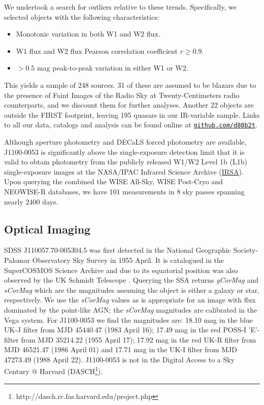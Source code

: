 \documentclass[a4paper,fleqn,usenatbib]{mnras}
\begin{document}
We undertook a search for outliers relative to these
trends. Specifically, we selected objects with the following
characteristics:
\begin{itemize}
  \item Monotonic variation in both W1 and W2 flux.
  \item W1 flux and W2 flux Pearson correlation coefficient $r \geq0.9$.
  \item $>0.5$ mag peak-to-peak variation in either W1 or W2.
\end{itemize}
This yields a sample of 248 sources. 31 of these are assumed to be
blazars due to the presence of Faint Images of the Radio Sky at
Twenty-Centimeters \citep[FIRST; ][]{Becker1995} radio counterparts,
and we discount them for further analyses. Another 22 objects are
outside the FIRST footprint, leaving 195 quasars in our IR-variable
sample. Links to all our data, catalogs and analysis can be found
online at \href{https://github.com/d80b2t}{{\tt github.com/d80b2t}}.

Although aperture photometry and DECaLS forced photometry
\citep{Lang2014, Meisner2017a, Meisner2017b} are available, J1100-0053
is significantly above the single-exposure detection limit that it is
valid to obtain photometry from the publicly released W1/W2 Level 1b
(L1b) single-exposure images at the NASA/IPAC Infrared Science Archive
(\href{http://irsa.ipac.caltech.edu/}{IRSA}).  Upon querying the
combined the WISE All-Sky, WISE Post-Cryo and NEOWISE-R databases, we
have 101 measurements in 8 sky passes spanning nearly 2400 days.

\subsection{Optical Imaging}
SDSS J110057.70-005304.5 was first detected in the National Geographic
Society-Palomar Observatory Sky Survey \cite[NGS-POSS; ][]{Abell1959,
Minkowski_Abell1963book} in 1955 April. It is catalogued in the
SuperCOSMOS Science Archive \citep[\href{http://ssa.roe.ac.uk/}{SSA};
][]{Hambly2001_I, Hambly2001_II} and due to its equatorial position
was also observed by the UK Schmidt Telescope \cite[UKST;
][]{Cannon1975, Cannon1979book}. Querying the SSA returns {\it
gCorMag} and {\it sCorMag} which are the magnitudes assuming the
object is either a galaxy or star, respectively. We use the {\it
sCorMag} values as is appropriate for an image with flux dominated by
the point-like AGN; the {\it sCorMag} magnitudes are calibrated in the
Vega system. For J1100-0053 we find the magnitudes are: 18.10 mag in
the blue UK-J filter from MJD 45440.47 (1983 April 16); 17.49 mag in
the red POSS-I 'E'-filter from MJD 35214.22 (1955 April 17); 17.92 mag
in the red UK-R filter from MJD 46521.47 (1986 April 01) and 17.71 mag
in the UK-I filter from MJD 47273.49 (1988 April 22). J1100-0053 is
not in the Digital Access to a Sky Century @ Harvard
(DASCH\footnote{http://dasch.rc.fas.harvard.edu/project.php}).
\end{document}
